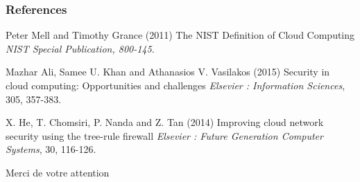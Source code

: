 \documentclass{beamer}
\begin{document}
\begin{frame}
\frametitle{References}
\footnotesize{
\begin{thebibliography}{99} %
 Peter Mell and Timothy Grance (2011)
\newblock The NIST Definition of Cloud Computing
\newblock \emph{NIST Special Publication, 800-145}.

 Mazhar Ali, Samee U. Khan and Athanasios V. Vasilakos (2015)
\newblock Security in cloud computing: Opportunities and challenges
\newblock \emph{Elsevier : Information Sciences}, 305, 357-383.

 X. He, T. Chomsiri, P. Nanda and Z. Tan (2014)
\newblock Improving cloud network security using the tree-rule firewall
\newblock \emph{Elsevier : Future Generation Computer Systems}, 30, 116-126.
\end{thebibliography}
}
\end{frame}




\begin{frame}
\Huge{\centerline{Merci de votre attention}}
\end{frame}


\end{document}
